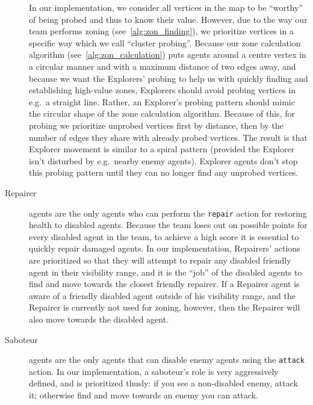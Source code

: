 \begin{description}
        In our implementation, we consider all vertices in the map to be \enquote{worthy} of being probed and thus to know their value.
        However, due to the way our team performs zoning (see~\autoref{alg:zon_finding}), we prioritize vertices in a specific way which we call \enquote{cluster probing}.
        Because our zone calculation algorithm (see~\autoref{alg:zon_calculation}) puts agents around a centre vertex in a circular manner and with a maximum distance of two edges away, and because we want the Explorers' probing to help us with quickly finding and establishing high-value zones, Explorers should avoid probing vertices in e.g.\ a straight line.
        Rather, an Explorer's probing pattern should mimic the circular shape of the zone calculation algorithm.
        Because of this, for probing we prioritize unprobed vertices first by distance, then by the number of edges they share with already probed vertices.
        The result is that Explorer movement is similar to a spiral pattern (provided the Explorer isn't disturbed by e.g.\ nearby enemy agents).
        Explorer agents don't stop this probing pattern until they can no longer find any unprobed vertices.
    \item[Repairer] agents are the only agents who can perform the \texttt{repair} action for restoring health to disabled agents.
        Because the team loses out on possible points for every disabled agent in the team, to achieve a high score it is essential to quickly repair damaged agents.
        In our implementation, Repairers' actions are prioritized so that they will attempt to repair any disabled friendly agent in their visibility range, and it is the \enquote{job} of the disabled agents to find and move towards the closest friendly repairer.
        If a Repairer agent is aware of a friendly disabled agent outside of his visibility range, and the Repairer is currently not used for zoning, however, then the Repairer will also move towards the disabled agent.
    \item[Saboteur] agents are the only agents that can disable enemy agents using the \texttt{attack} action.
        In our implementation, a saboteur's role is very aggressively defined, and is prioritized thusly: if you see a non-disabled enemy, attack it; otherwise find and move towards an enemy you can attack.


\end{description}
